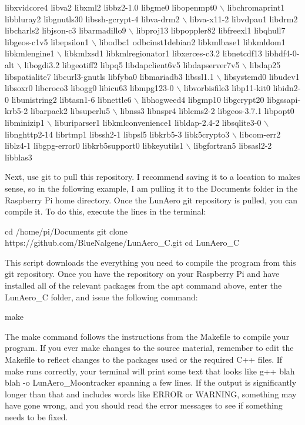 \begin{DoxyCode}
libxvidcore4 libva2 libxml2 libbz2-1.0 libgme0 libopenmpt0 \(\backslash\)
libchromaprint1 libbluray2 libgnutls30 libssh-gcrypt-4 libva-drm2 \(\backslash\)
libva-x11-2 libvdpau1 libdrm2 libcharls2 libjson-c3 libarmadillo9 \(\backslash\)
libproj13 libpoppler82 libfreexl1 libqhull7 libgeos-c1v5 libepsilon1 \(\backslash\)
libodbc1 odbcinst1debian2 libkmlbase1 libkmldom1 libkmlengine1 \(\backslash\)
libkmlxsd1 libkmlregionator1 libxerces-c3.2 libnetcdf13 libhdf4-0-alt \(\backslash\)
libogdi3.2 libgeotiff2 libpq5 libdapclient6v5 libdapserver7v5 \(\backslash\)
libdap25 libspatialite7 libcurl3-gnutls libfyba0 libmariadb3 libssl1.1 \(\backslash\)
libsystemd0 libudev1 libsoxr0 libcroco3 libogg0 libicu63 libmpg123-0 \(\backslash\)
libvorbisfile3 libp11-kit0 libidn2-0 libunistring2 libtasn1-6 libnettle6 \(\backslash\)
libhogweed4 libgmp10 libgcrypt20 libgssapi-krb5-2 libarpack2 libsuperlu5 \(\backslash\)
libnss3 libnspr4 liblcms2-2 libgeos-3.7.1 libpopt0 libminizip1 \(\backslash\)
liburiparser1 libkmlconvenience1 libldap-2.4-2 libsqlite3-0 \(\backslash\)
libnghttp2-14 librtmp1 libssh2-1 libpsl5 libkrb5-3 libk5crypto3 \(\backslash\)
libcom-err2 liblz4-1 libgpg-error0 libkrb5support0 libkeyutils1 \(\backslash\)
libgfortran5 libsasl2-2 libblas3 
\end{DoxyCode}


Next, use {\ttfamily git} to pull this repository. I recommend saving it to a location to makes sense, so in the following example, I am pulling it to the {\ttfamily Documents} folder in the Raspberry Pi home directory. Once the Lun\+Aero {\ttfamily git} repository is pulled, you can compile it. To do this, execute the lines in the terminal\+:


\begin{DoxyCode}
cd /home/pi/Documents
git clone https://github.com/BlueNalgene/LunAero\_C.git
cd LunAero\_C
\end{DoxyCode}


This script downloads the everything you need to compile the program from this {\ttfamily git} repository. Once you have the repository on your Raspberry Pi and have installed all of the relevant packages from the {\ttfamily apt} command above, enter the Lun\+Aero\+\_\+C folder, and issue the following command\+:


\begin{DoxyCode}
make
\end{DoxyCode}


The {\ttfamily make} command follows the instructions from the {\ttfamily Makefile} to compile your program. If you ever make changes to the source material, remember to edit the {\ttfamily Makefile} to reflect changes to the packages used or the required C++ files. If {\ttfamily make} runs correctly, your terminal will print some text that looks like {\ttfamily g++ blah blah -\/o Lun\+Aero\+\_\+\+Moontracker} spanning a few lines. If the output is significantly longer than that and includes words like E\+R\+R\+OR or W\+A\+R\+N\+I\+NG, something may have gone wrong, and you should read the error messages to see if something needs to be fixed.

